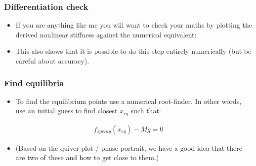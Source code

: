 \documentclass[9pt]{beamer-control}
\begin{document}
\begin{frame}
\frametitle{Differentiation check}
\begin{itemize}
\item If you are anything like me you will want to check your maths by plotting the derived nonlinear stiffness against the numerical equivalent:
\end{itemize}


\begin{itemize}
\item This also shows that it is possible to do this step entirely numerically (but be careful about accuracy).
\end{itemize}

\end{frame}

\begin{frame}
\frametitle{Find equilibria}
\begin{itemize}
\item To find the equilibrium points use a numerical root-finder. In other words, use an initial guess to find closest $x_{eq}$ such that:
\end{itemize}
\begin{align}
f_{spring}(x_{eq}) - Mg = 0
\end{align}
\begin{itemize}
\item (Based on the quiver plot / phase portrait, we have a good idea that there are two of these and how to get close to them.)
\end{itemize}

\end{frame}
\end{document}
